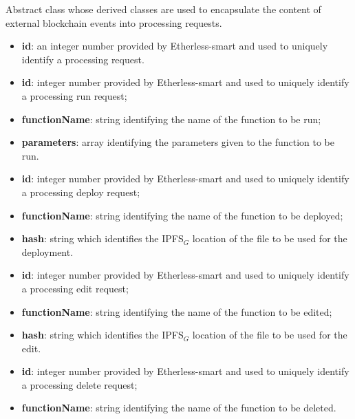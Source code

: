 	Abstract class whose derived classes are used to encapsulate the content of external blockchain events into processing requests.
	\begin{itemize}
		\item \textbf{id}: an integer number provided by Etherless-smart and used to uniquely identify a processing request.
	\end{itemize}
	\begin{itemize}
		\item \textbf{id}: integer number provided by Etherless-smart and used to uniquely identify a processing run request;
		\item \textbf{functionName}: string identifying the name of the function to be run;
		\item \textbf{parameters}: array identifying the parameters given to the function to be run.
	\end{itemize}
	\begin{itemize}
		\item \textbf{id}: integer number provided by Etherless-smart and used to uniquely identify a processing deploy request;
		\item \textbf{functionName}: string identifying the name of the function to be deployed;
		\item \textbf{hash}: string which identifies the IPFS$_{G}$ location of the file to be used for the deployment.
	\end{itemize}
	\begin{itemize}
		\item \textbf{id}: integer number provided by Etherless-smart and used to uniquely identify a processing edit request;
		\item \textbf{functionName}: string identifying the name of the function to be edited;
		\item \textbf{hash}: string which identifies the IPFS$_{G}$ location of the file to be used for the edit.
	\end{itemize}
	\begin{itemize}
		\item \textbf{id}: integer number provided by Etherless-smart and used to uniquely identify a processing delete request;
		\item \textbf{functionName}: string identifying the name of the function to be deleted.
	\end{itemize}

